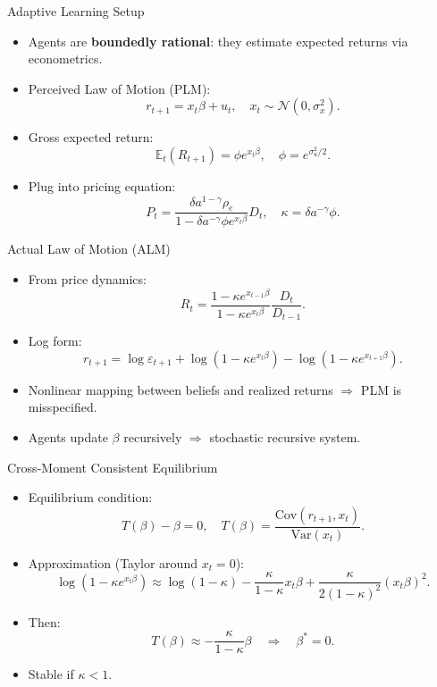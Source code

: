 \documentclass[compress,12pt]{beamer}
\begin{document}
\begin{frame}{Adaptive Learning Setup}
\begin{itemize}
    \item Agents are \textbf{boundedly rational}: they estimate expected returns via econometrics.
    \item Perceived Law of Motion (PLM):
    \[
    r_{t+1} = x_t \beta + u_t, \quad x_t \sim \mathcal{N}(0, \sigma_x^2).
    \]
    \item Gross expected return:
    \[
    \mathbb{E}_t(R_{t+1}) = \phi e^{x_t \beta}, \quad \phi = e^{\sigma_u^2 / 2}.
    \]
    \item Plug into pricing equation:
    \[
    P_t = \frac{\delta a^{1-\gamma}\rho_e}{1 - \delta a^{-\gamma}\phi e^{x_t \beta}} D_t,
    \quad
    \kappa = \delta a^{-\gamma}\phi.
    \]
\end{itemize}
\end{frame}

\begin{frame}{Actual Law of Motion (ALM)}
\begin{itemize}
    \item From price dynamics:
    \[
    R_t = \frac{1 - \kappa e^{x_{t-1}\beta}}{1 - \kappa e^{x_t \beta}}\frac{D_t}{D_{t-1}}.
    \]
    \item Log form:
    \[
    r_{t+1} = \log \varepsilon_{t+1}
               + \log(1 - \kappa e^{x_t \beta})
               - \log(1 - \kappa e^{x_{t+1} \beta}).
    \]
    \item Nonlinear mapping between beliefs and realized returns $\Rightarrow$ PLM is misspecified.
    \item Agents update $\beta$ recursively $\Rightarrow$ stochastic recursive system.
\end{itemize}
\end{frame}

\begin{frame}{Cross-Moment Consistent Equilibrium}
\begin{itemize}
    \item Equilibrium condition:
    \[
    T(\beta) - \beta = 0, \quad
    T(\beta) = \frac{\text{Cov}(r_{t+1}, x_t)}{\text{Var}(x_t)}.
    \]
    \item Approximation (Taylor around $x_t=0$):
    \[
    \log(1 - \kappa e^{x_t\beta}) \approx 
    \log(1-\kappa) - \frac{\kappa}{1-\kappa}x_t\beta + \frac{\kappa}{2(1-\kappa)^2}(x_t\beta)^2.
    \]
    \item Then:
    \[
    T(\beta) \approx -\frac{\kappa}{1-\kappa}\beta
    \quad \Rightarrow \quad
    \beta^* = 0.
    \]
    \item Stable if \( \kappa < 1 \).
\end{itemize}
\end{frame}
\end{document}

